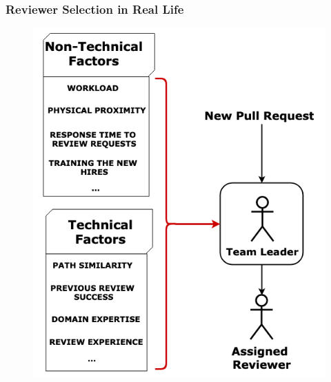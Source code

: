 \documentclass{beamer}
\begin{document}
\begin{frame}
\frametitle{\large Reviewer Selection in Real Life }
  \begin{figure}
    \vspace{-0.3cm}
    \includegraphics[height=1\textheight]{img/real-life.png}
    \end{figure}
\end{frame}
\end{document}
